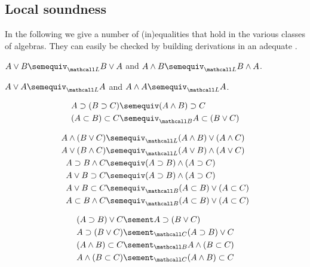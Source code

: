 \subsection{Local soundness}

In the following we give a number of (in)equalities that hold in the various
classes of algebras. They can easily be checked by building derivations in an
adequate .

\begin{fact}[Commutativity]
  $A \lor B \semequiv_{\Lattice} B \lor A$ and $A \land B \semequiv_{\Lattice} B \land A$.
\end{fact}

\begin{fact}[Idempotency]
  $A \lor A \semequiv_{\Lattice} A$ and $A \land A \semequiv_{\Lattice} A$.
\end{fact}

\begin{fact}[Currying]
  \begin{align*}
    A \limp (B \limp C) &\semequiv (A \land B) \limp C \\
    (A \lsub B) \lsub C &\semequiv_{\Brouwer} A \lsub (B \lor C)
  \end{align*}
\end{fact}

\begin{fact}[Distributivity]
  \begin{align*}
    A \land (B \lor C) &\semequiv_{\Lattice} (A \land B) \lor (A \land C) \\
    A \lor (B \land C) &\semequiv_{\Lattice} (A \lor B) \land (A \lor C) \\
    A \limp B \land C &\semequiv (A \limp B) \land (A \limp C) \\
    A \lor B \limp C &\semequiv (A \limp B) \land (A \limp C) \\
    A \lor B \lsub C &\semequiv_{\Brouwer} (A \lsub B) \lor (A \lsub C) \\
    A \lsub B \land C &\semequiv_{\Brouwer} (A \lsub B) \lor (A \lsub C)
  \end{align*}
\end{fact}

\begin{fact}
  \begin{align*}
    (A \limp B) \lor C &\sement A \limp (B \lor C) \\
    A \limp (B \lor C) &\sementC (A \limp B) \lor C \\
    (A \land B) \lsub C &\sementB A \land (B \lsub C) \\
    A \land (B \lsub C) &\sementC (A \land B) \lsub C
  \end{align*}
\end{fact}

